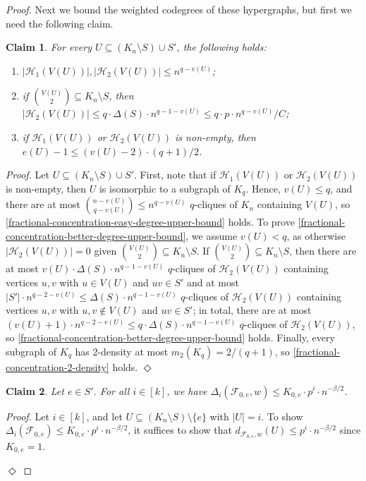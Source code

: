 \documentclass[11pt]{article}
\numberwithin{equation}{section}
\newcounter{i}
\theoremstyle{plain}
\newtheorem{claim}{Claim}[thm]
\newenvironment{proofclaim}[1][]%
{\noindent \emph{Proof.} {}{#1}{}}{\hfill
	$\Diamond$\vspace{1em}}
\theoremstyle{plain} %
\theoremstyle{definition}
\newcommand{\cF}{\mathcal{F}}
\newcommand{\cH}{\mathcal{H}}
\begin{document}
\begin{proof}
Next we bound the weighted codegrees of these hypergraphs, but first we need the following claim.
\begin{claim}\label{claim:fractional-concentration-codegrees-bound}
    For every $U \subseteq (K_n \setminus S) \cup S'$, the following holds:
\begin{enumerate}[label=(\alph*)]
    \item\label{fractional-concentration-easy-degree-upper-bound} 
    $|\cH_1(V(U))|, |\cH_2(V(U))| \leq n^{q - v(U)}$;
    \item\label{fractional-concentration-better-degree-upper-bound} 
    if $\binom{V(U)}{2} \subseteq K_n \setminus S$,  then $|\cH_2(V(U))| \leq q\cdot \Delta(S)\cdot n^{q - 1 - v(U)} \leq q\cdot  p \cdot n^{q - v(U)} / C$;
    \item\label{fractional-concentration-2-density} if $\cH_1(V(U))$ or $\cH_2(V(U))$ is non-empty, then $e(U) - 1 \leq (v(U) - 2)\cdot(q + 1) / 2$.
\end{enumerate}
\end{claim}
\begin{proofclaim}
Let $U \subseteq (K_n \setminus S) \cup S'$.  First, note that if $\cH_1(V(U))$ or $\cH_2(V(U))$ is non-empty, then $U$ is isomorphic to a subgraph of $K_q$.  
Hence, $v(U) \leq q$, and there are at most $\binom{n - v(U)}{q - v(U)} \leq n^{q - v(U)}$ $q$-cliques of $K_n$ containing $V(U)$, so \ref{fractional-concentration-easy-degree-upper-bound} holds. 
To prove \ref{fractional-concentration-better-degree-upper-bound}, we assume $v(U) < q$, as otherwise $|\cH_2(V(U))| = 0$ given $\binom{V(U)}{2} \subseteq K_n\setminus S$.  
If $\binom{V(U)}{2} \subseteq K_n \setminus S$, then there are at most $v(U)\cdot \Delta(S)\cdot n^{q - 1 - v(U)}$ $q$-cliques of $\cH_2(V(U))$ containing vertices $u,v$ with $u \in V(U)$ and $uv \in S'$ and at most $|S'|\cdot n^{q - 2 - v(U)} \leq \Delta(S)\cdot n^{q - 1 - v(U)}$ $q$-cliques of $\cH_2(V(U))$ containing vertices $u,v$ with $u,v\notin V(U)$ and $uv \in S'$; in total, there are at most $(v(U) + 1)\cdot n^{q - 2 - v(U)} \leq q\cdot \Delta(S)\cdot n^{q - 1 - v(U)}$ $q$-cliques of $\cH_2(V(U))$, so \ref{fractional-concentration-better-degree-upper-bound} holds.
Finally, every subgraph of $K_q$ has 2-density at most $m_2(K_q) = 2 / (q + 1)$, so \ref{fractional-concentration-2-density} holds.
\end{proofclaim}



\begin{claim}\label{cl:codegF}
Let $e \in S'$.  For all $i\in [k]$, we have $\Delta_i(\cF_{0,e}, w)\le K_{0,e}\cdot p^i\cdot n^{-\beta/2}$.%
\end{claim}
\begin{proofclaim}
Let $i\in [k]$, and let $U\subseteq (K_n\setminus S)\setminus \{e\}$ with $|U|=i$.  To show $\Delta_i(\cF_{0,e}) \leq K_{0,e} \cdot p^i\cdot n^{-\beta / 2}$, it suffices to show that $d_{\cF_{0,e}, w}(U) \le p^i\cdot n^{-\beta/2}$ since $K_{0,e}=1$.


\end{proofclaim}
\end{proof}
\end{document}
